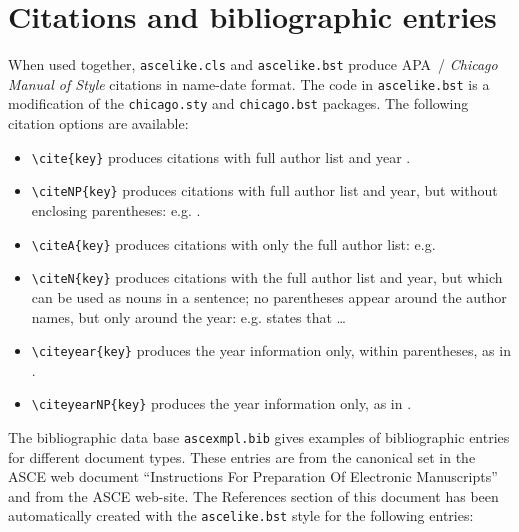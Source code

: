 \documentclass[Proceedings]{ascelike}
\begin{document}
\section{Citations and bibliographic entries}
When used together, \texttt{ascelike.cls} and \texttt{ascelike.bst}
produce APA~/ \emph{Chica\-go Manual of Style} citations in
name-date format.
The code in \texttt{ascelike.bst}
is a modification of the \texttt{chicago.sty} and
\texttt{chicago.bst} packages.
The following citation options are available:
\begin{itemize}
\item
\verb+\cite{key}+ produces citations with full author 
list and year \cite{Ireland:1954a}.
\item
\verb+\citeNP{key}+ produces citations with full author list and year, 
but without enclosing parentheses: e.g. .
\item
\verb+\citeA{key}+ produces citations with only the full 
author list: e.g. 
\item
\verb+\citeN{key}+ produces citations with the full author list and year, but
which can be used as nouns in a sentence; no parentheses appear around
the author names, but only around the year: e.g. 
states that \ldots
\item
\verb+\citeyear{key}+ produces the year information only, within parentheses,
as in \citeyear{Ireland:1954a}.
\item
\verb+\citeyearNP{key}+ produces the year information only,
as in .
\end{itemize}
%
\par
The bibliographic data base \texttt{ascexmpl.bib}
gives examples of bibliographic entries for different document types.
These entries are from the canonical set in the
ASCE web document ``Instructions For Preparation Of Electronic Manuscripts''
and from the ASCE web-site.
The References section of this document has been automatically created with
the \texttt{ascelike.bst} style for the following entries:
\end{document}
